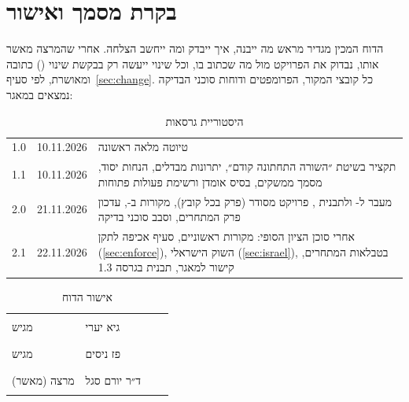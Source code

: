 \chapter*{בקרת מסמך ואישור}

הדוח המכין מגדיר מראש מה ייבנה, איך ייבדק ומה ייחשב הצלחה. אחרי שהמרצה מאשר אותו, נבדוק את הפרויקט מול מה שכתוב בו, וכל שינוי ייעשה רק בבקשת שינוי () כתובה ומאושרת, לפי סעיף~\ref{sec:change}. כל קובצי המקור, הפרומפטים ודוחות סוכני הבדיקה נמצאים במאגר:
\begin{center}\repolink\end{center}

\begin{table}[!htb]\centering
\caption{היסטוריית גרסאות}\label{tab:versions}
\begin{tabularx}{\linewidth}{@{}l l Y@{}}
\toprule
{} &  &  \\
\midrule
\num{1.0} & \num{10.11.2026} & טיוטה מלאה ראשונה \\
\num{1.1} & \num{10.11.2026} & תקציר בשיטת ״השורה התחתונה קודם״, יתרונות מבדלים, הנחות יסוד, מסמך ממשקים, בסיס אומדן ורשימת פעולות פתוחות \\
\num{2.0} & \num{21.11.2026} & מעבר ל- ולתבנית , פרויקט מסודר (פרק בכל קובץ), מקורות ב-, עדכון פרק המתחרים, וסבב סוכני בדיקה \\
\num{2.1} & \num{22.11.2026} & אחרי סוכן הציון הסופי: מקורות ראשוניים, סעיף אכיפה לתקן (\ref{sec:enforce}), השוק הישראלי (\ref{sec:israel}),  בטבלאות המתחרים, קישור למאגר, תבנית בגרסה \num{1.3} \\
\bottomrule
\end{tabularx}
\end{table}

\begin{table}[!htb]\centering
\caption{אישור הדוח}\label{tab:sign}
\begin{tabularx}{\linewidth}{@{}l Y l l@{}}
\toprule
{} &  &  &  \\
\midrule
מגיש & גיא יערי & \rule{2.6cm}{0.4pt} & \rule{1.8cm}{0.4pt} \\
מגיש & פז ניסים & \rule{2.6cm}{0.4pt} & \rule{1.8cm}{0.4pt} \\
מרצה (מאשר) & ד״ר יורם סגל & \rule{2.6cm}{0.4pt} & \rule{1.8cm}{0.4pt} \\
\bottomrule
\end{tabularx}
\end{table}

